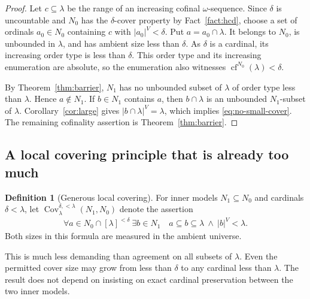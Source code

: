 \documentclass[11pt,letterpaper]{article}
\theoremstyle{definition}
\newtheorem{definition}{Definition}[section]
\newcommand{\cf}{\operatorname{cf}}
\newcommand{\Cov}{\operatorname{Cov}}
\begin{document}
\begin{proof}
Let $c\subseteq\lambda$ be the range of an increasing cofinal $\omega$-sequence.
Since $\delta$ is uncountable and $N_0$ has the $\delta$-cover property by
Fact~\ref{fact:hcd}, choose a set of ordinals $a_0\in N_0$ containing $c$ with
$|a_0|^V<\delta$. Put $a=a_0\cap\lambda$. It belongs to $N_0$, is unbounded
in $\lambda$, and has ambient size less than $\delta$. As $\delta$ is a
cardinal, its increasing order type is less than $\delta$. This order type
and its increasing enumeration are absolute, so the enumeration also
witnesses $\cf^{N_0}(\lambda)<\delta$.

By Theorem~\ref{thm:barrier}, $N_1$ has no unbounded subset of $\lambda$ of
order type less than $\lambda$. Hence $a\notin N_1$. If $b\in N_1$ contains
$a$, then $b\cap\lambda$ is an unbounded $N_1$-subset of $\lambda$.
Corollary~\ref{cor:large} gives $|b\cap\lambda|^V=\lambda$, which implies
\eqref{eq:no-small-cover}. The remaining cofinality assertion is
Theorem~\ref{thm:barrier}.
\end{proof}

\subsection{A local covering principle that is already too much}

\begin{definition}[Generous local covering]\label{def:localcover}
For inner models $N_1\subseteq N_0$ and cardinals $\delta<\lambda$, let
$\Cov_\lambda^{\delta,<\lambda}(N_1,N_0)$ denote the assertion
\begin{equation}\label{eq:localcover}
 \begin{split}
 \forall a\in N_0\cap[\lambda]^{<\delta}\ \exists b\in N_1\quad
 a\subseteq b\subseteq\lambda\ \wedge\ |b|^V<\lambda.
 \end{split}
\end{equation}
Both sizes in this formula are measured in the ambient universe.
\end{definition}

This is much less demanding than agreement on all subsets of $\lambda$.
Even the permitted cover size may grow from less than $\delta$ to any cardinal
less than $\lambda$. The result does not depend on insisting on exact cardinal
preservation between the two inner models.
\end{document}
